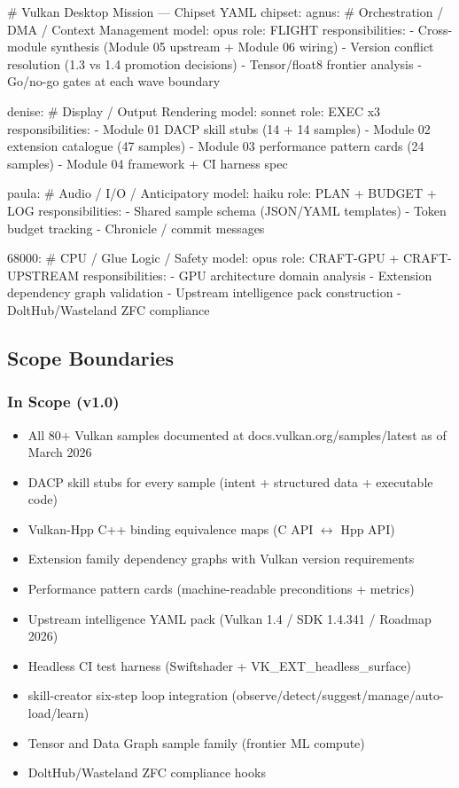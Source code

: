 \documentclass[11pt,letterpaper]{article}
\begin{document}
\begin{asciibox}
# Vulkan Desktop Mission --- Chipset YAML
chipset:
  agnus:             # Orchestration / DMA / Context Management
    model: opus
    role: FLIGHT
    responsibilities:
      - Cross-module synthesis (Module 05 upstream + Module 06 wiring)
      - Version conflict resolution (1.3 vs 1.4 promotion decisions)
      - Tensor/float8 frontier analysis
      - Go/no-go gates at each wave boundary

  denise:            # Display / Output Rendering
    model: sonnet
    role: EXEC x3
    responsibilities:
      - Module 01 DACP skill stubs (14 + 14 samples)
      - Module 02 extension catalogue (47 samples)
      - Module 03 performance pattern cards (24 samples)
      - Module 04 framework + CI harness spec

  paula:             # Audio / I/O / Anticipatory
    model: haiku
    role: PLAN + BUDGET + LOG
    responsibilities:
      - Shared sample schema (JSON/YAML templates)
      - Token budget tracking
      - Chronicle / commit messages

  68000:             # CPU / Glue Logic / Safety
    model: opus
    role: CRAFT-GPU + CRAFT-UPSTREAM
    responsibilities:
      - GPU architecture domain analysis
      - Extension dependency graph validation
      - Upstream intelligence pack construction
      - DoltHub/Wasteland ZFC compliance
\end{asciibox}

\subsection{Scope Boundaries}

\subsubsection{In Scope (v1.0)}
\begin{itemize}[noitemsep]
  \item All 80+ Vulkan samples documented at docs.vulkan.org/samples/latest as of March 2026
  \item DACP skill stubs for every sample (intent + structured data + executable code)
  \item Vulkan-Hpp C++ binding equivalence maps (C API $\leftrightarrow$ Hpp API)
  \item Extension family dependency graphs with Vulkan version requirements
  \item Performance pattern cards (machine-readable preconditions + metrics)
  \item Upstream intelligence YAML pack (Vulkan 1.4 / SDK 1.4.341 / Roadmap 2026)
  \item Headless CI test harness (Swiftshader + VK\_EXT\_headless\_surface)
  \item skill-creator six-step loop integration (observe/detect/suggest/manage/auto-load/learn)
  \item Tensor and Data Graph sample family (frontier ML compute)
  \item DoltHub/Wasteland ZFC compliance hooks
\end{itemize}
\end{document}
